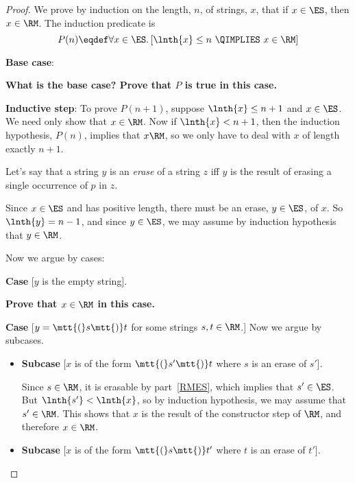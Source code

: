 \begin{problem}
\begin{proof}

We prove by induction on the length, $n$, of strings, $x$, that if $x \in
\ES$, then $x \in \RM$.  The induction predicate is
\[
P(n) \eqdef \forall x \in \ES.\, [\lnth{x} \leq n\ \QIMPLIES\ x \in \RM]
\]

\textbf{Base case}:

\textbf{ What is the base case?  Prove that $P$ is true in this case.}


\textbf{Inductive step}: To prove $P(n+1)$, suppose $\lnth{x} \leq n+1$
and $x \in \ES$.  We need only show that $x \in \RM$.  Now if $\lnth{x} <
n+1$, then the induction hypothesis, $P(n)$, implies that $x \RM$, so we
only have to deal with $x$ of length exactly $n+1$.

Let's say that a string $y$ is an \emph{erase} of a string $z$ iff $y$ is
the result of erasing a single occurrence of $p$ in $z$.

Since $x \in \ES$ and has positive length, there must be an erase, $y \in
\ES$, of $x$.  So $\lnth{y} = n-1$, and since $y \in \ES$, we may assume
by induction hypothesis that $y \in \RM$.

Now we argue by cases:

\textbf{Case} [$y$ is the empty string].

\textbf{Prove that $x \in \RM$ in this case.}


\textbf{Case} [$y = \mtt{(}s\mtt{)}t$ for some strings $s, t \in \RM$.]
Now we argue by subcases.
\begin{itemize}

\item \textbf{Subcase} [$x$ is of the form $\mtt{(}s'\mtt{)}t$ where $s$
  is an erase of $s'$].

  Since $s \in \RM$, it is erasable by part~\eqref{RMES}, which implies
  that $s'\in \ES$.  But $\lnth{s'} < \lnth{x}$, so by induction
  hypothesis, we may assume that $s' \in \RM$.  This shows that $x$ is
  the result of the constructor step of $\RM$, and therefore $x \in \RM$.

\item \textbf{Subcase} [$x$ is of the form $\mtt{(}s\mtt{)}t'$ where $t$ is an
  erase of $t'$].


\end{itemize}
\end{proof}
\end{problem}
